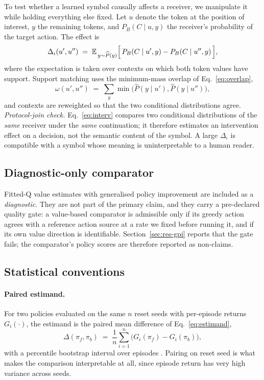 \documentclass[11pt,a4paper]{article}
\begin{document}
To test whether a learned symbol causally affects a receiver, we manipulate it while holding everything else fixed. Let $u$ denote the token at the position of interest, $y$ the remaining tokens, and $P_{B}(C\mid u,y)$ the receiver's probability of the target action. The effect is
\begin{equation}
\label{eq:interv}
\Delta_{\iota}(u',u'') \;=\; \mathbb{E}_{\,y\sim\widehat{P}(y)}\Bigl[\, P_{B}(C\mid u',y) - P_{B}(C\mid u'',y) \,\Bigr],
\end{equation}
where the expectation is taken over contexts on which both token values have support. Support matching uses the minimum-mass overlap of Eq.~\eqref{eq:overlap},
\begin{equation}
\label{eq:overlap}
\omega(u',u'') \;=\; \sum_{y} \min\bigl(\widehat{P}(y\mid u'), \widehat{P}(y\mid u'')\bigr),
\end{equation}
and contexts are reweighted so that the two conditional distributions agree. \emph{Protocol-join check.} Eq.~\eqref{eq:interv} compares two conditional distributions of the \emph{same} receiver under the \emph{same} continuation; it therefore estimates an intervention effect on a decision, not the semantic content of the symbol. A large $\Delta_{\iota}$ is compatible with a symbol whose meaning is uninterpretable to a human reader.

\subsection{Diagnostic-only comparator}
\label{sec:method-gpi}

Fitted-Q value estimates with generalised policy improvement \citep{barreto2017,thakoor2022} are included as a \emph{diagnostic}. They are not part of the primary claim, and they carry a pre-declared quality gate: a value-based comparator is admissible only if its greedy action agrees with a reference action source at a rate we fixed before running it, and if its own value direction is identifiable. Section~\ref{sec:res-gpi} reports that the gate fails; the comparator's policy scores are therefore reported as non-claims.

\subsection{Statistical conventions}
\label{sec:method-stats}

\paragraph{Paired estimand.} For two policies evaluated on the same $n$ reset seeds with per-episode returns $G_{i}(\cdot)$, the estimand is the paired mean difference of Eq.~\eqref{eq:estimand},
\begin{equation}
\label{eq:estimand}
\Delta(\pi_{f},\pi_{b}) \;=\; \frac{1}{n}\sum_{i=1}^{n}\bigl(G_{i}(\pi_{f}) - G_{i}(\pi_{b})\bigr),
\end{equation}
with a percentile bootstrap interval over episodes \citep{agarwal2021}. Pairing on reset seed is what makes the comparison interpretable at all, since episode return has very high variance across seeds.
\end{document}
